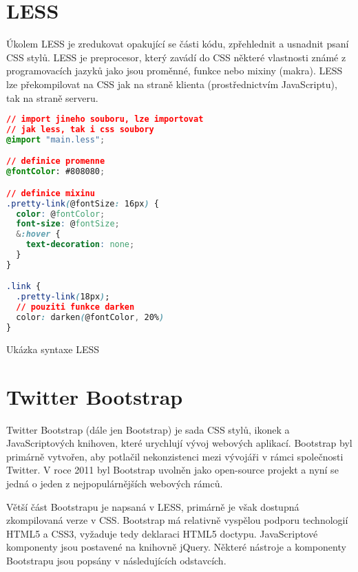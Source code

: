\section{LESS}
\label{sec:less}

Úkolem LESS je zredukovat opakující se části kódu, zpřehlednit a usnadnit psaní CSS stylů. LESS je preprocesor, který zavádí do CSS některé vlastnosti známé z programovacích jazyků jako jsou proměnné, funkce nebo mixiny (makra). LESS lze překompilovat na CSS jak na straně klienta (prostřednictvím JavaScriptu), tak na straně serveru.

\begin{example}
    \centering
    \begin{lstlisting}[language=css]
// import jineho souboru, lze importovat
// jak less, tak i css soubory
@import "main.less";

// definice promenne
@fontColor: #808080;

// definice mixinu
.pretty-link(@fontSize: 16px) {
  color: @fontColor;
  font-size: @fontSize;
  &:hover {
    text-decoration: none;
  }
}

.link {
  .pretty-link(18px);
  // pouziti funkce darken
  color: darken(@fontColor, 20%)
}
    \end{lstlisting}
    \caption{Ukázka syntaxe LESS}
    \label{example:less-css}
\end{example}

\section{Twitter Bootstrap}
\label{sec:bootstrap}

Twitter Bootstrap (dále jen Bootstrap) je sada CSS stylů, ikonek a JavaScriptových knihoven, které urychlují vývoj webových aplikací. Bootstrap byl primárně vytvořen, aby potlačil nekonzistenci mezi vývojáři v rámci společnosti Twitter. V roce 2011 byl Bootstrap uvolněn jako open-source projekt a nyní se jedná o jeden z nejpopulárnějších webových rámců.

Větší část Bootstrapu je napsaná v LESS, primárně je však dostupná zkompilovaná verze v CSS. Bootstrap má relativně vyspělou podporu technologií HTML5 a CSS3, vyžaduje tedy deklaraci HTML5 doctypu. JavaScriptové komponenty jsou postavené na knihovně jQuery\footnotemark[2]. Některé nástroje a komponenty Bootstrapu jsou popsány v následujících odstavcích.


